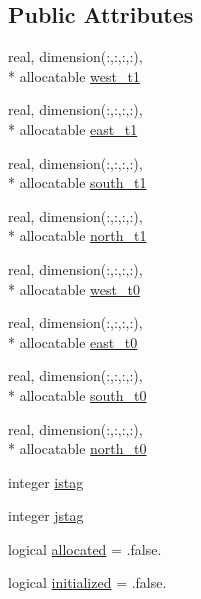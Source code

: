\subsection*{Public Attributes}
\begin{DoxyCompactItemize}
\item 
real, dimension(\-:,\-:,\-:,\-:), \\*
allocatable \hyperlink{structfv__arrays__mod_1_1fv__nest__bc__type__4d_a0ce309c499ec88025396f768151f5ae5}{west\-\_\-t1}
\item 
real, dimension(\-:,\-:,\-:,\-:), \\*
allocatable \hyperlink{structfv__arrays__mod_1_1fv__nest__bc__type__4d_a9fa39750a15f788f1a5fdbf6928e410b}{east\-\_\-t1}
\item 
real, dimension(\-:,\-:,\-:,\-:), \\*
allocatable \hyperlink{structfv__arrays__mod_1_1fv__nest__bc__type__4d_a8c7b5e62f810595da5d2f3e668cecb46}{south\-\_\-t1}
\item 
real, dimension(\-:,\-:,\-:,\-:), \\*
allocatable \hyperlink{structfv__arrays__mod_1_1fv__nest__bc__type__4d_a4fbf3b9d6d638d71ab2c2e6d9b3e56e9}{north\-\_\-t1}
\item 
real, dimension(\-:,\-:,\-:,\-:), \\*
allocatable \hyperlink{structfv__arrays__mod_1_1fv__nest__bc__type__4d_a6d5755433238a327bc454f0f8ecf7715}{west\-\_\-t0}
\item 
real, dimension(\-:,\-:,\-:,\-:), \\*
allocatable \hyperlink{structfv__arrays__mod_1_1fv__nest__bc__type__4d_aeccab4bd2caf19bda2d666dda8303078}{east\-\_\-t0}
\item 
real, dimension(\-:,\-:,\-:,\-:), \\*
allocatable \hyperlink{structfv__arrays__mod_1_1fv__nest__bc__type__4d_ab62fffbc0f148a5bb51c3f75492011c2}{south\-\_\-t0}
\item 
real, dimension(\-:,\-:,\-:,\-:), \\*
allocatable \hyperlink{structfv__arrays__mod_1_1fv__nest__bc__type__4d_a5f1d1d5872ea278e2711f79b8e3f4011}{north\-\_\-t0}
\item 
integer \hyperlink{structfv__arrays__mod_1_1fv__nest__bc__type__4d_a722647a593199bed1b1c149522653a1f}{istag}
\item 
integer \hyperlink{structfv__arrays__mod_1_1fv__nest__bc__type__4d_a5589c9903be6ae678db7acd0d1027106}{jstag}
\item 
logical \hyperlink{structfv__arrays__mod_1_1fv__nest__bc__type__4d_acfab2a0567a19b21201b9eb512461ef6}{allocated} = .false.
\item 
logical \hyperlink{structfv__arrays__mod_1_1fv__nest__bc__type__4d_aecff9a6f77e18f40c82fe06def548222}{initialized} = .false.
\end{DoxyCompactItemize}


